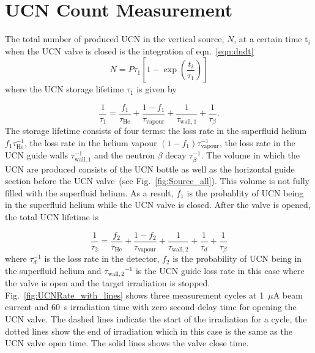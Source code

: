 \section{UCN Count Measurement \label{UCNCounts}}

The total number of produced UCN in the vertical source, $N$, at a
certain time t$_i$ when the UCN valve is closed is the integration of
eqn.~\ref{eqn:dndt}
\begin{equation}
  \label{eq:totalUCN}
  N = P \tau_1\left[ 1- \exp \left(\frac{t_i }{ \tau_1}\right) \right]
\end{equation}
where the UCN storage lifetime $\tau_1$ is given by

\begin{equation}
  \label{eqn:tau1}
  \frac{1}{\tau_1} = \frac{ f_1}{\tau_\mathrm{He}} + \frac{1-f_1}{\tau_\mathrm{vapour}}+\frac{1}{\tau_\mathrm{wall,1}} + \frac{1}{\tau_\beta}.
\end{equation}
The storage lifetime consists of four terms: the loss rate in the
superfluid helium $ f_1\tau_\mathrm{He}^{-1}$, the loss rate in the
helium vapour $(1-f_1)\tau_\mathrm{vapour}^{-1}$, the loss rate in the
UCN guide walls $\tau_\mathrm{wall,1}^{-1}$ and the neutron $\beta$
decay $\tau_\beta^{-1}$. The volume in which the UCN are produced
consists of the UCN bottle as well as the horizontal guide section
before the UCN valve~(see Fig.~\ref{fig:Source_all}). This volume is
not fully filled with the superfluid helium. As a result, $ f_1$ is
the probablity of UCN being in the superfluid helium while the UCN
valve is closed. After the valve is opened, the total UCN lifetime is

\begin{equation}
  \label{eqn:tau2}
  \frac{1}{\tau_2} = \frac{ f_2}{\tau_\mathrm{He}} + \frac{1-f_2}{\tau_\mathrm{vapour}}+ \frac{1}{\tau_\mathrm{wall,2}}+\frac{1}{\tau_d} + \frac{1}{\tau_\beta}
\end{equation}
where $\tau_d^{-1}$ is the loss rate in the detector,
$f_2$ is the probability of UCN being in the superfluid
helium and ${\tau_\mathrm{wall,2}}^{-1}$ is the UCN guide loss rate in
this case where the valve is open and the target irradiation is
stopped. Fig.~\ref{fig:UCNRate_with_lines} shows three measurement
cycles at 1~$\mu$A beam current and 60~s irradiation time with
zero second delay time for opening the UCN valve. The dashed lines
indicate the start of the irradiation for a cycle, the dotted lines
show the end of irradiation which in this case is the same as the UCN
valve open time. The solid lines shows the valve close time.


